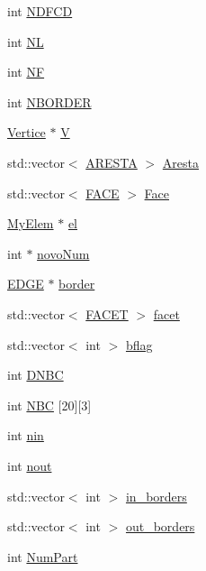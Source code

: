 \begin{DoxyCompactItemize}
\item 
int \hyperlink{classGeProb_a2894b14d50728f945721f2c85e1fba4d}{N\+D\+F\+CD}
\item 
int \hyperlink{classGeProb_a4608e6b80b16c86a7bd7451adebc6f69}{NL}
\item 
int \hyperlink{classGeProb_a4168b4f9002df61cb396728b9eecbdca}{NF}
\item 
int \hyperlink{classGeProb_a7ff7ce9c7e12c1bb099c41b7fdc91d7d}{N\+B\+O\+R\+D\+ER}
\item 
\hyperlink{structVertice}{Vertice} $\ast$ \hyperlink{classGeProb_aaa26398869b601604a4a5f3032c46070}{V}
\item 
std\+::vector$<$ \hyperlink{structARESTA}{A\+R\+E\+S\+TA} $>$ \hyperlink{classGeProb_af82bffefd5e8fe33dec7ef5b8098a9b4}{Aresta}
\item 
std\+::vector$<$ \hyperlink{structFACE}{F\+A\+CE} $>$ \hyperlink{classGeProb_af050a3c4e639bd19028c49877aa10583}{Face}
\item 
\hyperlink{DG__Prob_8h_a83cd887ced9a6587428f267e50cd4787}{My\+Elem} $\ast$ \hyperlink{classGeProb_ac32127758c84295eb361466cf37afcac}{el}
\item 
int $\ast$ \hyperlink{classGeProb_ab8ee4f31d624e14988e65a7cd5c6a457}{novo\+Num}
\item 
\hyperlink{structEDGE}{E\+D\+GE} $\ast$ \hyperlink{classGeProb_a6c144ac05b601c5d6141c711edaaa775}{border}
\item 
std\+::vector$<$ \hyperlink{structFACET}{F\+A\+C\+ET} $>$ \hyperlink{classGeProb_a876f8c65be4b17f3c2b7b4b0605f34c1}{facet}
\item 
std\+::vector$<$ int $>$ \hyperlink{classGeProb_a60d3ba92d41a0776cdb3869e9bfeff7e}{bflag}
\item 
int \hyperlink{classGeProb_a416b1ac091d91a8959a4ff2518948466}{D\+N\+BC}
\item 
int \hyperlink{classGeProb_a5fb604ebcc5130a7ad4719d5f6578cb9}{N\+BC} \mbox{[}20\mbox{]}\mbox{[}3\mbox{]}
\item 
int \hyperlink{classGeProb_a2434630926ff59b81f12420354f533a7}{nin}
\item 
int \hyperlink{classGeProb_ae6ee447645542bcb3addd78e9896f546}{nout}
\item 
std\+::vector$<$ int $>$ \hyperlink{classGeProb_a9615df97c98b9b37d98f8548fad48439}{in\+\_\+borders}
\item 
std\+::vector$<$ int $>$ \hyperlink{classGeProb_a2ac12ca16e62807fd3c69d97bf665336}{out\+\_\+borders}
\item 
int \hyperlink{classGeProb_ab269c3e7eeb6ae7c5fd87ae54df757b2}{Num\+Part}

\end{DoxyCompactItemize}
